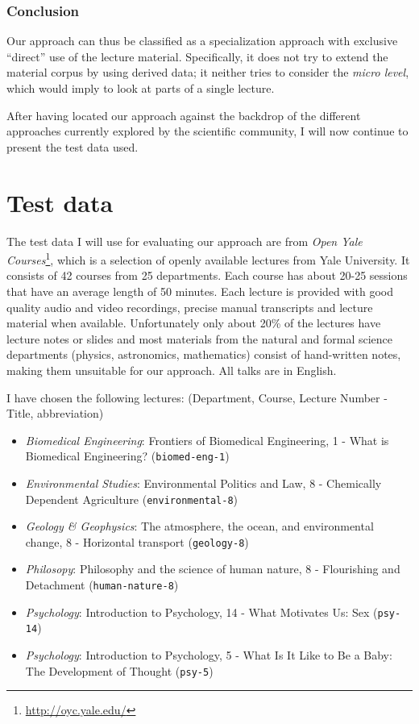 \documentclass[]{article}
\begin{document}
\subsubsection{Conclusion }\label{conclusion}

Our approach can thus be classified as a specialization approach with
exclusive ``direct'' use of the lecture material. Specifically, it does
not try to extend the material corpus by using derived data; it neither
tries to consider the \emph{micro level}, which would imply to look at
parts of a single lecture.

After having located our approach against the backdrop of the different
approaches currently explored by the scientific community, I will now
continue to present the test data used.

\section{Test data}\label{data}

The test data I will use for evaluating our approach are from \emph{Open
Yale Courses}\footnote{\url{http://oyc.yale.edu/}}, which is a selection
of openly available lectures from Yale University. It consists of 42
courses from 25 departments. Each course has about 20-25 sessions that
have an average length of 50 minutes. Each lecture is provided with good
quality audio and video recordings, precise manual transcripts and
lecture material when available. Unfortunately only about 20\% of the
lectures have lecture notes or slides and most materials from the
natural and formal science departments (physics, astronomics,
mathematics) consist of hand-written notes, making them unsuitable for
our approach. All talks are in English.

I have chosen the following lectures: (Department, Course, Lecture
Number - Title, abbreviation)

\begin{itemize}
\item
  \emph{Biomedical Engineering}: Frontiers of Biomedical Engineering, 1
  - What is Biomedical Engineering? (\texttt{biomed-eng-1})
\item
  \emph{Environmental Studies}: Environmental Politics and Law, 8 -
  Chemically Dependent Agriculture (\texttt{environmental-8})
\item
  \emph{Geology \& Geophysics}: The atmosphere, the ocean, and
  environmental change, 8 - Horizontal transport (\texttt{geology-8})
\item
  \emph{Philosopy}: Philosophy and the science of human nature, 8 -
  Flourishing and Detachment (\texttt{human-nature-8})
\item
  \emph{Psychology}: Introduction to Psychology, 14 - What Motivates Us:
  Sex (\texttt{psy-14})
\item
  \emph{Psychology}: Introduction to Psychology, 5 - What Is It Like to
  Be a Baby: The Development of Thought (\texttt{psy-5})
\end{itemize}
\end{document}

